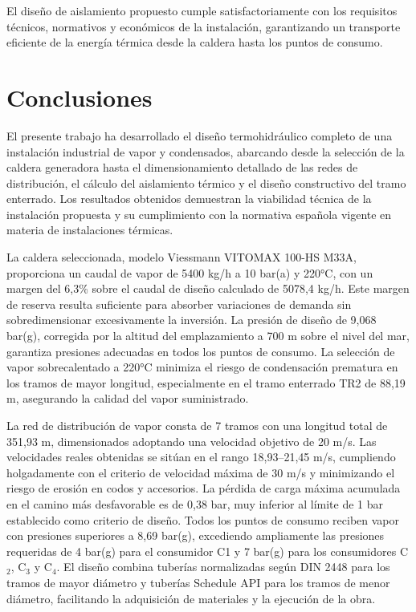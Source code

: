\documentclass[12pt]{article}
\begin{document}
El diseño de aislamiento propuesto cumple satisfactoriamente con los requisitos técnicos, normativos y económicos de la instalación, garantizando un transporte eficiente de la energía térmica desde la caldera hasta los puntos de consumo.



\section{Conclusiones}
\label{sec:conclusiones}

El presente trabajo ha desarrollado el diseño termohidráulico completo de una instalación industrial de vapor y condensados, abarcando desde la selección de la caldera generadora hasta el dimensionamiento detallado de las redes de distribución, el cálculo del aislamiento térmico y el diseño constructivo del tramo enterrado. Los resultados obtenidos demuestran la viabilidad técnica de la instalación propuesta y su cumplimiento con la normativa española vigente en materia de instalaciones térmicas.

La caldera seleccionada, modelo Viessmann VITOMAX 100-HS M33A, proporciona un caudal de vapor de 5400 kg/h a 10 bar(a) y 220°C, con un margen del 6,3\% sobre el caudal de diseño calculado de 5078,4 kg/h. Este margen de reserva resulta suficiente para absorber variaciones de demanda sin sobredimensionar excesivamente la inversión. La presión de diseño de 9,068 bar(g), corregida por la altitud del emplazamiento a 700 m sobre el nivel del mar, garantiza presiones adecuadas en todos los puntos de consumo. La selección de vapor sobrecalentado a 220°C minimiza el riesgo de condensación prematura en los tramos de mayor longitud, especialmente en el tramo enterrado TR2 de 88,19 m, asegurando la calidad del vapor suministrado.

La red de distribución de vapor consta de 7 tramos con una longitud total de 351,93 m, dimensionados adoptando una velocidad objetivo de 20 m/s. Las velocidades reales obtenidas se sitúan en el rango 18,93--21,45 m/s, cumpliendo holgadamente con el criterio de velocidad máxima de 30 m/s y minimizando el riesgo de erosión en codos y accesorios. La pérdida de carga máxima acumulada en el camino más desfavorable es de 0,38 bar, muy inferior al límite de 1 bar establecido como criterio de diseño. Todos los puntos de consumo reciben vapor con presiones superiores a 8,69 bar(g), excediendo ampliamente las presiones requeridas de 4 bar(g) para el consumidor C1 y 7 bar(g) para los consumidores C$_2$, C$_3$ y C$_4$. El diseño combina tuberías normalizadas según DIN 2448 para los tramos de mayor diámetro y tuberías Schedule API para los tramos de menor diámetro, facilitando la adquisición de materiales y la ejecución de la obra.
\end{document}
